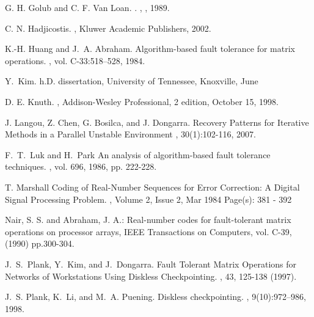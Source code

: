 \documentclass{sig-alternate}
\begin{document}
\begin{thebibliography}{14}
{G. H. Golub and C. F. Van Loan}.
.
, {}, {1989}.

C. N. Hadjicostis.
,
Kluwer Academic Publishers, 2002.  


K.-H. Huang and J.~A. Abraham.
\newblock Algorithm-based fault tolerance for matrix operations.
, vol. C-33:518--528, 1984.

Y.~Kim.
h.{D}. dissertation, University of Tennessee, Knoxville, June


D. E. Knuth.
, 
Addison-Wesley Professional, 2 edition, October 15, 1998.


J. Langou, Z. Chen, G. Bosilca, and J. Dongarra.
\newblock Recovery Patterns for Iterative Methods in a Parallel Unstable Environment
, 30(1):102-116, 2007.

F.~T.~Luk and H.~Park
\newblock An analysis of algorithm-based fault tolerance techniques.
, vol. 696, 1986, pp. 222-228.


T. Marshall
\newblock Coding of Real-Number Sequences for Error Correction: A Digital Signal Processing Problem.
, 
Volume 2, Issue 2, Mar 1984 Page(s): 381 - 392


Nair, S. S. and Abraham, J. A.:
Real-number codes for fault-tolerant
matrix operations on processor arrays, IEEE Transactions on Computers, vol. C-39,(1990) pp.300-304.


J.~S.~Plank, Y.~Kim, and J.~Dongarra.
\newblock Fault Tolerant Matrix Operations for Networks of Workstations Using Diskless Checkpointing.
, 43, 125-138 (1997).


J.~S. Plank, K.~Li, and M.~A. Puening.
\newblock Diskless checkpointing.
, 9(10):972--986, 1998.




\end{thebibliography}
\end{document}
